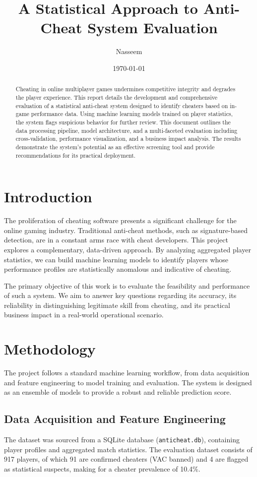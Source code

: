 \documentclass{article}
\title{A Statistical Approach to Anti-Cheat System Evaluation}
\author{Nasseem}
\date{\today}
\begin{document}
\maketitle

\begin{abstract}
Cheating in online multiplayer games undermines competitive integrity and degrades the player experience. This report details the development and comprehensive evaluation of a statistical anti-cheat system designed to identify cheaters based on in-game performance data. Using machine learning models trained on player statistics, the system flags suspicious behavior for further review. This document outlines the data processing pipeline, model architecture, and a multi-faceted evaluation including cross-validation, performance visualization, and a business impact analysis. The results demonstrate the system's potential as an effective screening tool and provide recommendations for its practical deployment.
\end{abstract}

\section{Introduction}
The proliferation of cheating software presents a significant challenge for the online gaming industry. Traditional anti-cheat methods, such as signature-based detection, are in a constant arms race with cheat developers. This project explores a complementary, data-driven approach. By analyzing aggregated player statistics, we can build machine learning models to identify players whose performance profiles are statistically anomalous and indicative of cheating.

The primary objective of this work is to evaluate the feasibility and performance of such a system. We aim to answer key questions regarding its accuracy, its reliability in distinguishing legitimate skill from cheating, and its practical business impact in a real-world operational scenario.

\section{Methodology}
The project follows a standard machine learning workflow, from data acquisition and feature engineering to model training and evaluation. The system is designed as an ensemble of models to provide a robust and reliable prediction score.

\subsection{Data Acquisition and Feature Engineering}
The dataset was sourced from a SQLite database (\texttt{anticheat.db}), containing player profiles and aggregated match statistics. The evaluation dataset consists of 917 players, of which 91 are confirmed cheaters (VAC banned) and 4 are flagged as statistical suspects, making for a cheater prevalence of 10.4\%.
\end{document}
